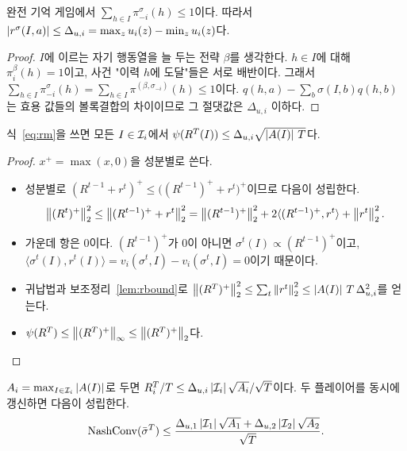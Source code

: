 \begin{lemma}[순간 후회의 크기]\label{lem:rbound}
완전 기억 게임에서 $\sum_{h\in I}\pi^\sigma_{-i}(h)\le1$이다. 따라서 $\left\lvert r^\sigma(I,a)\right\rvert\le\Delta_{u,i}=\max_zu_i(z)-\min_zu_i(z)$다.
\end{lemma}
\begin{proof}
$I$에 이르는 자기 행동열을 늘 두는 전략 $\beta$를 생각한다. $h\in I$에 대해 $\pi_i^\beta(h)=1$이고, 사건 "이력 $h$에 도달"들은 서로 배반이다.
그래서 $\sum_{h\in I}\pi_{-i}^\sigma(h)=\sum_{h\in I}\pi^{(\beta,\sigma_{-i})}(h)\le1$이다.
$q(h,a)-\sum_b\sigma(I,b)q(h,b)$는 효용 값들의 볼록결합의 차이이므로 그 절댓값은 $\Delta_{u,i}$ 이하다.
\end{proof}

\begin{theorem}\label{thm:rm}
식~\eqref{eq:rm}을 쓰면 모든 $I\in\mathcal{I}_i$에서 $\psi(R^T(I))\le\Delta_{u,i}\sqrt{\left\lvert A(I)\right\rvert\,T}$다.
\end{theorem}
\begin{proof}
$x^+=\max(x,0)$을 성분별로 쓴다.
\begin{itemize}
  \item 성분별로 $(R^{t-1}+r^t)^+\le\big((R^{t-1})^++r^t\big)^+$이므로 다음이 성립한다.
  \[
  \left\lVert (R^t)^+\right\rVert_2^2\le\left\lVert (R^{t-1})^++r^t\right\rVert_2^2=\left\lVert (R^{t-1})^+\right\rVert_2^2+2\langle(R^{t-1})^+,r^t\rangle+\left\lVert r^t\right\rVert_2^2.
  \]
  \item 가운데 항은 0이다. $(R^{t-1})^+$가 0이 아니면 $\sigma^t(I)\propto(R^{t-1})^+$이고, $\langle\sigma^t(I),r^t(I)\rangle=v_i(\sigma^t,I)-v_i(\sigma^t,I)=0$이기 때문이다.
  \item 귀납법과 보조정리~\ref{lem:rbound}로 $\left\lVert (R^T)^+\right\rVert_2^2\le\sum_t\left\lVert r^t\right\rVert_2^2\le\left\lvert A(I)\right\rvert\,T\,\Delta_{u,i}^2$를 얻는다.
  \item $\psi(R^T)\le\left\lVert (R^T)^+\right\rVert_\infty\le\left\lVert (R^T)^+\right\rVert_2$다.
\end{itemize}
\end{proof}

\begin{corollary}\label{cor:cfr}
$A_i=\max_{I\in\mathcal{I}_i}\left\lvert A(I)\right\rvert$로 두면 $R_i^T/T\le\Delta_{u,i}\left\lvert \mathcal{I}_i\right\rvert\sqrt{A_i}/\sqrt T$이다.
두 플레이어를 동시에 갱신하면 다음이 성립한다.
\[
\mathrm{NashConv}(\bar\sigma^T)\le\frac{\Delta_{u,1}\left\lvert \mathcal{I}_1\right\rvert\sqrt{A_1}+\Delta_{u,2}\left\lvert \mathcal{I}_2\right\rvert\sqrt{A_2}}{\sqrt T}.
\]
\end{corollary}

